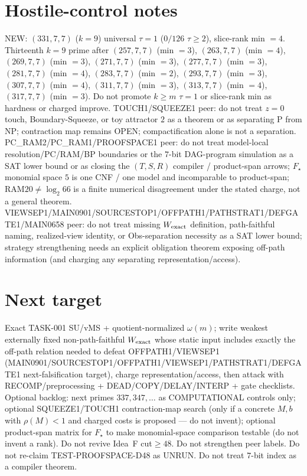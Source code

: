 \documentclass[11pt]{article}
\begin{document}
\section*{Hostile-control notes}
NEW: $(331,7,7)$ ($k{=}9$) universal $\tau{=}1$ ($0/126$ $\tau{\ge}2$), slice-rank min $=4$.
Thirteenth $k{=}9$ prime after $(257,7,7)$ (min $=3$), $(263,7,7)$ (min $=4$), $(269,7,7)$ (min $=3$), $(271,7,7)$ (min $=3$), $(277,7,7)$ (min $=3$), $(281,7,7)$ (min $=4$), $(283,7,7)$ (min $=2$), $(293,7,7)$ (min $=3$), $(307,7,7)$ (min $=4$), $(311,7,7)$ (min $=3$), $(313,7,7)$ (min $=4$), $(317,7,7)$ (min $=3$).
Do not promote $k{\ge}m$ $\tau{=}1$ or slice-rank min as hardness or charged improve.
TOUCH1/SQUEEZE1 peer: do not treat $z{=}0$ touch, Boundary-Squeeze, or toy attractor $2$ as a theorem or as separating P from NP;
contraction map remains OPEN; compactification alone is not a separation.
PC\_RAM2/PC\_RAM1/PROOFSPACE1 peer: do not treat model-local resolution/PC/RAM/BP boundaries or the $7$-bit DAG-program simulation as a SAT lower bound
or as closing the $(T,S,R)$ compiler / product-span arrows; $F_\star$ monomial space $5$ is one CNF / one model and incomparable to product-span;
RAM$20\neq\log_2 66$ is a finite numerical disagreement under the stated charge, not a general theorem.
VIEWSEP1/MAIN0901/SOURCESTOP1/OFFPATH1/PATHSTRAT1/DEFGATE1/MAIN0658 peer: do not treat missing $W_{\rm exact}$ definition,
path-faithful naming, realized-view identity, or Obs-separation necessity as a SAT lower bound;
strategy strengthening needs an explicit obligation theorem exposing off-path information
(and charging any separating representation/access).

\section*{Next target}
Exact TASK-001 SU/vMS + quotient-normalized $\omega(m)$; write weakest externally fixed non-path-faithful
$W_{\rm exact}$ whose static input includes exactly the off-path relation needed to defeat OFFPATH1/VIEWSEP1
(MAIN0901/SOURCESTOP1/OFFPATH1/VIEWSEP1/PATHSTRAT1/DEFGATE1 next-falsification target), charge representation/access,
then attack with RECOMP/preprocessing + DEAD/COPY/DELAY/INTERP + gate checklists.
Optional backlog: next primes $337,347,\ldots$ as COMPUTATIONAL controls only;
optional SQUEEZE1/TOUCH1 contraction-map search (only if a concrete $M,b$ with $\rho(M)<1$ and charged costs is proposed --- do not invent);
optional product-span matrix for $F_\star$ to make monomial-space comparison testable (do not invent a rank).
Do not revive Idea~F cut$\ge48$. Do not strengthen peer labels.
Do not re-claim TEST-PROOFSPACE-D48 as UNRUN.
Do not treat $7$-bit index as a compiler theorem.
\end{document}
